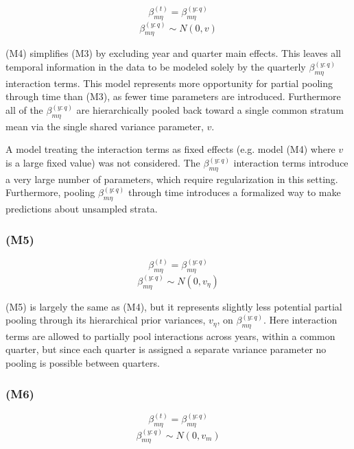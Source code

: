 \documentclass[12pt]{article}
\begin{document}
\[\beta^{(t)}_{m\eta} = \beta^{(y:q)}_{m\eta}\]
\[\beta^{(y:q)}_{m\eta} \sim N(0, v)\]

(M4) simplifies (M3) by excluding year and quarter main effects. This
leaves all temporal information in the data to be modeled solely by the
quarterly \(\beta^{(y:q)}_{m\eta}\) interaction terms. This model
represents more opportunity for partial pooling through time than (M3),
as fewer time parameters are introduced. Furthermore all of the
\(\beta^{(y:q)}_{m\eta}\) are hierarchically pooled back toward a single
common stratum mean via the single shared variance parameter, \(v\). 

A model treating the interaction terms as fixed effects (e.g. model (M4) where 
$v$ is a large fixed value) was not considered. The \(\beta^{(y:q)}_{m\eta}\) 
interaction terms introduce a very large number of parameters, which require 
regularization in this setting. Furthermore, pooling \(\beta^{(y:q)}_{m\eta}\) 
through time introduces a formalized way to make predictions about unsampled 
strata.


\subsubsection{(M5)}\label{m5}

\[\beta^{(t)}_{m\eta} = \beta^{(y:q)}_{m\eta}\]
\[\beta^{(y:q)}_{m\eta} \sim N(0, v_\eta)\]

(M5) is largely the same as (M4), but it represents slightly less
potential partial pooling through its hierarchical prior variances,
\(v_\eta\), on \(\beta^{(y:q)}_{m\eta}\). Here interaction terms are
allowed to partially pool interactions across years, within a common
quarter, but since each quarter is assigned a separate variance
parameter no pooling is possible between quarters.

\subsubsection{(M6)}\label{m6}

\[\beta^{(t)}_{m\eta} = \beta^{(y:q)}_{m\eta}\]
\[\beta^{(y:q)}_{m\eta} \sim N(0, v_m)\]
\end{document}
